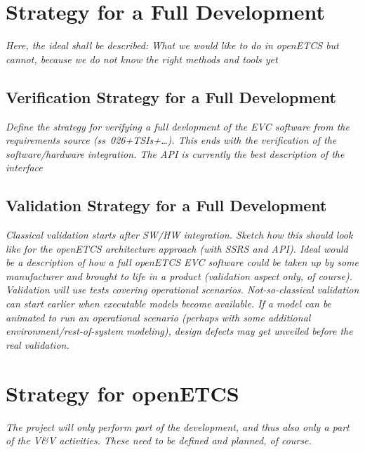 \documentclass{template/openetcs_report}
\begin{document}
\section{\VV Strategy for a Full Development }
\label{sec:vv-strategy-full}



\textit{Here, the ideal shall be described: What we would like to do
  in openETCS but cannot, because we do not know the right methods and
tools yet }

\subsection{Verification Strategy for a Full Development}
\label{sec:verif-strategy-full}



{\it 
Define the strategy for verifying a full devlopment of the EVC software
from the requirements source (ss~026+TSIs+\ldots). This ends with the
verification of the software/hardware integration. The API is
currently the best description of the
interface }

\subsection{Validation Strategy for a Full Development}
\label{sec:valid-strategy-full}

\textit{Classical validation starts after SW/HW integration. Sketch
  how this should look like for the openETCS architecture approach
  (with SSRS and API). Ideal would be a description of how a full
  openETCS EVC software could be taken up by some manufacturer and
  brought to life in a product (validation aspect only, of
  course). Validation will use tests covering operational scenarios.
Not-so-classical validation can start earlier when executable models
become available. If a model can be animated to run an operational
scenario (perhaps with some additional environment/rest-of-system
modeling), design defects may get unveiled before the real validation.}



\section{\VV Strategy for openETCS}
\label{sec:vv-strategy-project}

{\it The project will only perform part of the development, and thus
  also only a part of the V\&V activities. These need to be defined
  and planned, of course.  }
\end{document}
